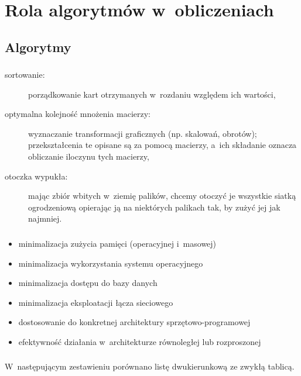 \chapter{Rola algorytmów w~obliczeniach}

\section{Algorytmy}

\subsection{} %
\begin{description}
	\item[sortowanie:] porządkowanie kart otrzymanych w~rozdaniu względem ich wartości,
	\item[optymalna kolejność mnożenia macierzy:] wyznaczanie transformacji graficznych (np. skalowań, obrotów); przekształcenia te opisane są za pomocą macierzy, a~ich składanie oznacza obliczanie iloczynu tych macierzy,
	\item[otoczka wypukła:] mając zbiór wbitych w~ziemię palików, chcemy otoczyć je wszystkie siatką ogrodzeniową opierając ją na niektórych palikach tak, by zużyć jej jak najmniej.
\end{description}

\subsection{} %
\begin{itemize}
	\item minimalizacja zużycia pamięci (operacyjnej i~masowej)
	\item minimalizacja wykorzystania systemu operacyjnego
	\item minimalizacja dostępu do bazy danych
	\item minimalizacja eksploatacji łącza sieciowego
	\item dostosowanie do konkretnej architektury sprzętowo-programowej
	\item efektywność działania w~architekturze równoległej lub rozproszonej
\end{itemize}

\subsection{} %
W~następującym zestawieniu porównano listę dwukierunkową ze zwykłą tablicą.

